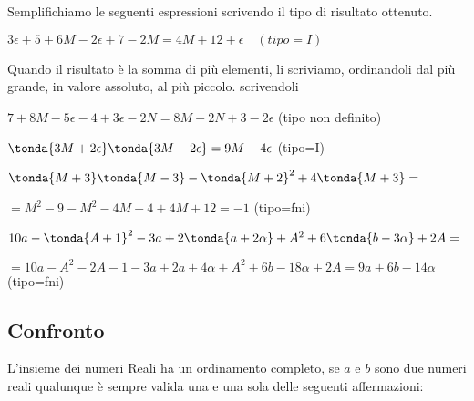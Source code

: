 \begin{exrig}
Semplifichiamo le seguenti espressioni scrivendo il tipo di risultato 
ottenuto.

 \begin{esempio}
  \(3\epsilon +5 +6M -2\epsilon +7 -2M = 4M +12 +\epsilon \quad (tipo=I)\)
 \end{esempio}

\begin{osservazione}
Quando il risultato è la somma di più elementi, li scriviamo, ordinandoli 
dal più grande, in valore assoluto, al più piccolo.
scrivendoli 
\end{osservazione}

 \begin{esempio}
\(7 +8M -5\epsilon  -4 +3\epsilon-2N = 8M -2N +3 -2\epsilon\)
\quad (tipo non definito)
 \end{esempio}
 
 \begin{esempio}
\(\tonda{3M +2\epsilon} \tonda{3M -2\epsilon} = 9M -4\epsilon\)
\quad (tipo=I)
 \end{esempio}
 
 \begin{esempio}
\(\tonda{M +3} \tonda{M -3} - \tonda{M+2}^2 +4\tonda{M +3}=\)

\(=M^2 -9 -M^2 -4M -4 +4M +12 = -1\)
\quad (tipo=fni)
 \end{esempio}
 
 \begin{esempio}
\(10a -\tonda{A +1}^2 -3a +2\tonda{a+2\alpha} +A^2 +6\tonda{b -3\alpha} 
+2A= 
\)

\(=10a -A^2 -2A -1 -3a +2a+4\alpha +A^2 +6b -18\alpha +2A = 9a +6b 
-14\alpha\) 
\quad (tipo=fni)
 \end{esempio}
\end{exrig}


\subsection{Confronto}
\label{subsec:insnum_confronto}

L'insieme dei numeri Reali ha un ordinamento completo, se \(a\) e \(b\) sono 
due numeri reali qualunque è sempre valida una e una sola delle seguenti 
affermazioni:

